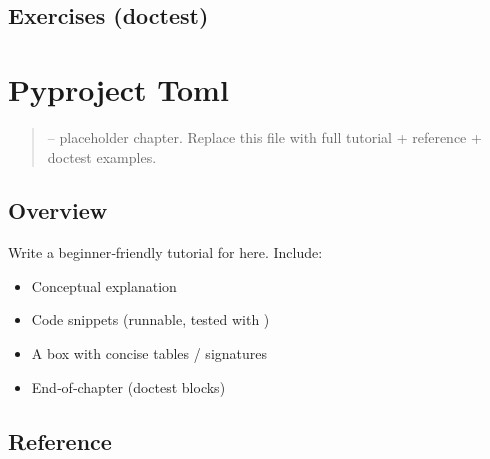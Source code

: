 \documentclass[a4paper,11pt,english]{sphinxmanual}
\begin{document}
\subsection{Exercises (doctest)}
\label{\detokenize{packaging/publishing:exercises-doctest}}
\begin{sphinxVerbatim}[commandchars=\\\{\}]
\end{sphinxVerbatim}

\sphinxstepscope


\section{Pyproject Toml}
\label{\detokenize{packaging/pyproject_toml:pyproject-toml}}\label{\detokenize{packaging/pyproject_toml::doc}}\begin{quote}

\sphinxAtStartPar
{} – placeholder chapter. Replace this file with full tutorial + reference + doctest examples.
\end{quote}


\subsection{Overview}
\label{\detokenize{packaging/pyproject_toml:overview}}
\sphinxAtStartPar
Write a beginner‑friendly tutorial for  here. Include:
\begin{itemize}
\item {} 
\sphinxAtStartPar
Conceptual explanation

\item {} 
\sphinxAtStartPar
Code snippets (runnable, tested with )

\item {} 
\sphinxAtStartPar
A  box with concise tables / signatures

\item {} 
\sphinxAtStartPar
End‑of‑chapter  (doctest blocks)

\end{itemize}


\subsection{Reference}
\label{\detokenize{packaging/pyproject_toml:reference}}
\end{document}
